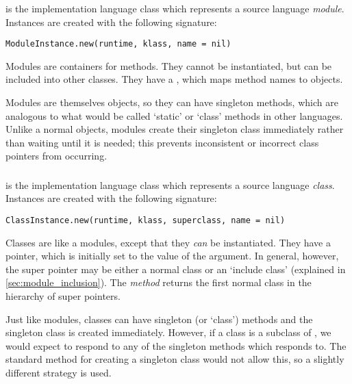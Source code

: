 \subsubsection{}

 is the implementation language class which represents a source language \textit{module}. Instances are created with the following signature:

\begin{lstlisting}
ModuleInstance.new(runtime, klass, name = nil)
\end{lstlisting}

Modules are containers for methods. They cannot be instantiated, but can be included into other classes. They have a , which maps method names to  objects.

Modules are themselves objects, so they can have singleton methods, which are analogous to what would be called `static' or `class' methods in other languages. Unlike a normal objects, modules create their singleton class immediately rather than waiting until it is needed; this prevents inconsistent or incorrect class pointers from occurring.

\subsubsection{}

 is the implementation language class which represents a source language \textit{class}. Instances are created with the following signature:

\begin{lstlisting}
ClassInstance.new(runtime, klass, superclass, name = nil)
\end{lstlisting}

Classes are like a modules, except that they \textit{can} be instantiated. They have a  pointer, which is initially set to the value of the  argument. In general, however, the super pointer may be either a normal class or an `include class' (explained in \autoref{sec:module_inclusion}). The  \textit{method} returns the first normal class in the hierarchy of super pointers.

Just like modules, classes can have singleton (or `class') methods and the singleton class is created immediately. However, if a class  is a subclass of , we would expect  to respond to any of the singleton methods which  responds to. The standard method for creating a singleton class would not allow this, so a slightly different strategy is used.

